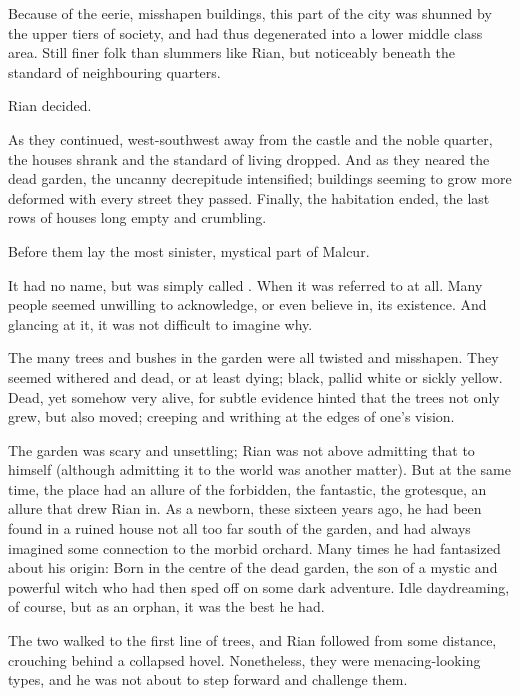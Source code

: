 \begin{garbage}
Because of the eerie, misshapen buildings, this part of the city was shunned by the upper tiers of society, and had thus degenerated into a lower middle class area. Still finer folk than slummers like Rian, but noticeably beneath the standard of neighbouring quarters. 

 Rian decided. 

As they continued, west-southwest away from the castle and the noble quarter, the houses shrank and the standard of living dropped. And as they neared the dead garden, the uncanny decrepitude intensified; buildings seeming to grow more deformed with every street they passed. Finally, the habitation ended, the last rows of houses long empty and crumbling. 

Before them lay the most sinister, mystical part of Malcur. 

It had no name, but was simply called . When it was referred to at all. Many people seemed unwilling to acknowledge, or even believe in, its existence. And glancing at it, it was not difficult to imagine why. 

The many trees and bushes in the garden were all twisted and misshapen. They seemed withered and dead, or at least dying; \coloured black, pallid white or sickly yellow. Dead, yet somehow very alive, for subtle evidence hinted that the trees not only grew, but also moved; creeping and writhing at the edges of one's vision. 

The garden was scary and unsettling; Rian was not above admitting that to himself (although admitting it to the world was another matter). But at the same time, the place had an allure of the forbidden, the fantastic, the grotesque, an allure that drew Rian in. As a newborn, these sixteen years ago, he had been found in a ruined house not all too far south of the garden, and had always imagined some connection to the morbid orchard. Many times he had fantasized about his origin: Born in the centre of the dead garden, the son of a mystic and powerful witch who had then sped off on some dark adventure. Idle daydreaming, of course, but as an orphan, it was the best he had. 

The two \scathae{} walked to the first line of trees, and Rian followed from some distance, crouching behind a collapsed hovel. 
Nonetheless, they were menacing-looking types, and he was not about to step forward and challenge them. 


\end{garbage}
